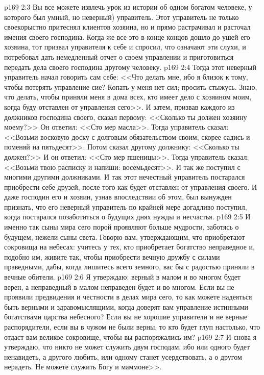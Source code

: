 \vs p169 2:3 Вы все можете извлечь урок из истории об одном богатом человеке, у которого был умный, но неверный) управитель. Этот управитель не только своекорыстно притеснял клиентов хозяина, но и прямо растрачивал и расточал имения своего господина. Когда же все это в конце концов дошло до ушей его хозяина, тот призвал управителя к себе и спросил, что означают эти слухи, и потребовал дать немедленный отчет о своем управлении и приготовиться передать дела своего господина другому человеку.
\vs p169 2:4 Тогда этот неверный управитель начал говорить сам себе: <<Что делать мне, ибо я близок к тому, чтобы потерять управление сие? Копать у меня нет сил; просить стыжусь. Знаю, что делать, чтобы приняли меня в дома всех, кто имеет дело с хозяином моим, когда буду отставлен от управления сего>>. И затем, призвав каждого из должников господина своего, сказал первому: <<Сколько ты должен хозяину моему?>> Он ответил: <<Сто мер масла>>. Тогда управитель сказал: <<Возьми восковую доску с долговым обязательством своим, скорее садись и поменяй на пятьдесят>>. Потом сказал другому должнику: <<Сколько ты должен?>> И он ответил: <<Сто мер пшеницы>>. Тогда управитель сказал: <<Возьми твою расписку и напиши: восемьдесят>>. И так же поступил с многими другими должниками. И так этот нечестный управитель постарался приобрести себе друзей, после того как будет отставлен от управления своего. И даже господин его и хозяин, узнав впоследствии об этом, был вынужден признать, что его неверный управитель по крайней мере догадливо поступил, когда постарался позаботиться о будущих днях нужды и несчастья.
\vs p169 2:5 И именно так сыны мира сего порой проявляют больше мудрости, заботясь о будущем, нежели сыны света. Говорю вам, утверждающим, что приобретают сокровища на небесах: учитесь у тех, кто приобретает богатство неправедное и, подобно им, живите так, чтобы приобрести вечную дружбу с силами праведными, дабы, когда лишитесь всего земного, вас бы с радостью приняли в вечные обители.
\vs p169 2:6 Я утверждаю: верный в малом и во многом будет верен, а неправедный в малом неправеден будет и во многом. Если вы не проявили предвидения и честности в делах мира сего, то как можете надеяться быть верными и здравомыслящими, когда доверят вам управление истинными богатствами царства небесного? Если вы не хорошие управители и не верные распорядители, если вы в чужом не были верны, то кто будет глуп настолько, что отдаст вам великое сокровище, чтобы вы распоряжались им?
\vs p169 2:7 И снова я утверждаю, что никто не может служить двум господам, ибо или одного будет ненавидеть, а другого любить, или одному станет усердствовать, а о другом нерадеть. Не можете служить Богу и маммоне>>.
